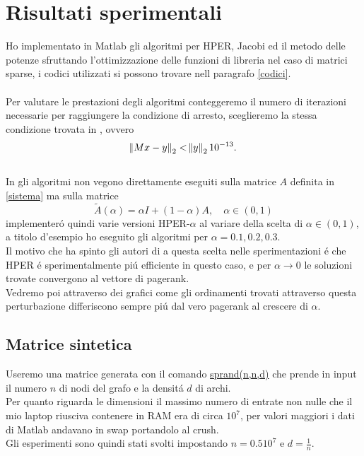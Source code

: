 \documentclass[12pt,a4paper]{amsart}
\numberwithin{equation}{section}
\theoremstyle{plain}
\theoremstyle{definition}
\begin{document}
\section{Risultati sperimentali}
Ho implementato in Matlab gli algoritmi per HPER, Jacobi ed il metodo delle potenze sfruttando l'ottimizzazione delle funzioni di libreria nel caso di matrici sparse, i codici utilizzati si possono trovare nell paragrafo \ref{codici}.\\
\\
Per valutare le prestazioni degli algoritmi conteggeremo il numero di iterazioni necessarie per raggiungere la condizione di arresto, sceglieremo la stessa condizione trovata in \cite{Tudisco}, ovvero
\begin{equation}
\norm{Mx-y}_2 < \norm{y}_2 10^{-13}.
\end{equation}
\\
In \cite{Tudisco} gli algoritmi non vegono direttamente eseguiti sulla matrice $A$ definita in \eqref{sistema} ma sulla matrice
\begin{equation}
\widetilde{A}(\alpha)=\alpha I + (1-\alpha) A, \quad \alpha \in (0,1)
\end{equation}
implementer\'o quindi varie versioni HPER-$\alpha$ al variare della scelta di $\alpha \in (0,1)$, a titolo d'esempio ho eseguito gli algoritmi per $\alpha= 0.1, 0.2, 0.3$.\\
Il motivo che ha spinto gli autori di \cite{Tudisco} a questa scelta nelle sperimentazioni \'e che HPER \'e sperimentalmente pi\'u efficiente in questo caso, e per $\alpha \rightarrow 0 $ le soluzioni trovate convergono al vettore di pagerank.\\
Vedremo poi attraverso dei grafici come gli ordinamenti trovati attraverso questa perturbazione differiscono sempre pi\'u dal vero pagerank al crescere di $\alpha $.


\subsection{Matrice sintetica}
Useremo una matrice generata con il comando \url{sprand(n,n,d)} che prende in input il numero $n$ di nodi del grafo e la densit\'a $d$ di archi. \\
Per quanto riguarda le dimensioni il massimo numero di entrate non nulle che il mio laptop riusciva contenere in RAM era di circa $10^7$, per valori maggiori i dati di Matlab andavano in swap portandolo al crush.\\
Gli esperimenti sono quindi stati svolti impostando $n=0.5 10^7$ e $d=\frac{1}{n}$.\\
\end{document}

